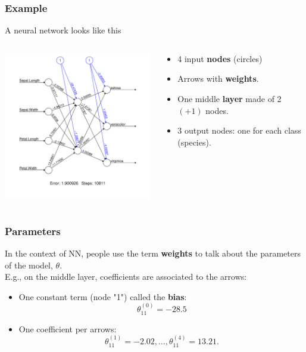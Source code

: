 \begin{frame}
\frametitle{Example}
A neural network looks like this
\begin{columns}
\begin{column}{0.6\linewidth}
\includegraphics[width=8cm]{../../Graphs/NN_Iris.pdf}
\end{column}
\begin{column}{0.4\linewidth}
\begin{itemize}
\item 4 input {\bf nodes} (circles) 
\item Arrows with {\bf weights}.
\item One middle {\bf layer} made of 2 $(+1)$ nodes.
\item 3 output nodes: one for each class (species).
\end{itemize}
\end{column}
\end{columns}
\end{frame}
\begin{frame}
\frametitle{Parameters}
In the context of NN, people use the term {\bf weights} to talk about the parameters of the model, $\theta$.\\
\vspace{0.3cm}
E.g., on the middle layer, coefficients are associated to the arrows:
\begin{itemize}
\item One constant term (node "1") called the {\bf bias}: 
$$
\theta_{11}^{(0)}=-28.5
$$
\item One coefficient per arrows: 
$$
\theta_{11}^{(1)}=-2.02, \ldots, \theta_{11}^{(4)}=13.21.
$$
\end{itemize}
\end{frame}
